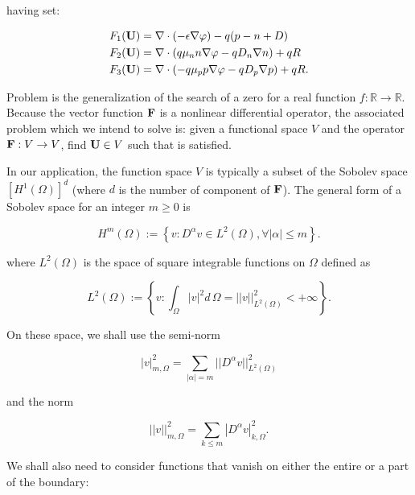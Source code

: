 having set:

\begin{align*}
F_1(\mathbf{U}) & = \nabla \cdot (-\epsilon \nabla \varphi) - q(p-n+D) \\
F_2(\mathbf{U}) & = \nabla \cdot ( q\mu_n n \nabla \varphi - qD_n \nabla n )+qR \\
F_3(\mathbf{U}) & = \nabla \cdot (- q\mu_p p \nabla \varphi - qD_p \nabla p )+qR.
\end{align*}

Problem  is the generalization of the search of a zero for a real function $f:\mathbb{R}\rightarrow\mathbb{R}$. Because the vector function $\mathbf{F}$ is a nonlinear differential operator, the associated problem which we intend to solve is: given a functional space $V$ and the operator $\mathbf{F}:V\rightarrow V$, find $\mathbf{U}\in V$ such that  is satisfied.

In our application, the function space $V$ is typically a subset of the Sobolev space  $[H^1(\Omega)]^d$ (where $d$ is the number of component of $\mathbf{F}$). 
The general form of a Sobolev space for an integer $m\geq 0$ is

\begin{equation}
\label{space: Hm}
H^m(\Omega) := \left\{ v : D^{\alpha}v\in L^2(\Omega),\forall |\alpha|\leq m \right\}.
\end{equation}

where $L^2(\Omega)$ is the space of square integrable functions on $\Omega$ defined as

\begin{equation}
\label{space: L2}
L^2(\Omega) := \left\{ v : \int_{\Omega} |v|^2 d\,\Omega =||v||^2_{L^2(\Omega)}<+\infty \right\}.
\end{equation}

On these space, we shall use the semi-norm

\begin{equation}
\label{eq: semiorm sobolev}
|v|_{m,\Omega}^2 = \sum_{|\alpha|=m} ||D^{\alpha}v||^2_{L^2(\Omega)}
\end{equation}

and the norm

\begin{equation}
\label{eq: norm sobolev}
||v||_{m,\Omega}^2 = \sum_{k\leq m} |D^{\alpha}v|^2_{k,\Omega}.
\end{equation}

We shall also need to consider functions that vanish on either the entire or a part of the boundary:

